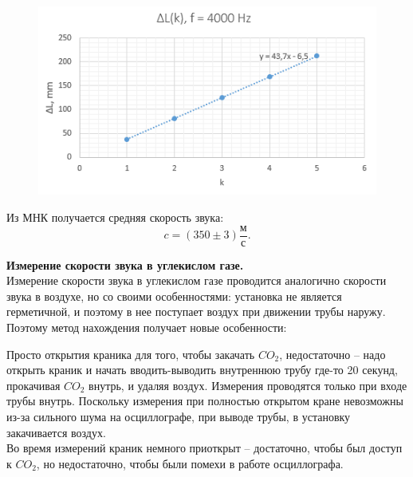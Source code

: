 \documentclass[12pt,a4paper]{article}
\begin{document}
\begin{figure}[h]
    \centering
    \begin{center}
    \end{center}
    \includegraphics[width=10 cm]{plot4.PNG}
    \label{fig:plot4}
\end{figure} 
\newpage

Из МНК получается средняя скорость звука:
$$c = (350\pm3)\frac{\text{м}}{\text{с}}.$$

\textbf{Измерение скорости звука в углекислом газе.}\\
Измерение скорости звука в углекислом газе проводится аналогично скорости звука в воздухе, но со своими особенностями: установка не является герметичной, и поэтому в нее поступает воздух при движении трубы наружу. Поэтому метод нахождения получает новые особенности:

Просто открытия краника для того, чтобы закачать $CO_2$, недостаточно -- надо открыть краник и начать вводить-выводить внутреннюю трубу где-то 20 секунд, прокачивая $CO_2$ внутрь, и удаляя воздух.
 Измерения проводятся только при входе трубы внутрь. Поскольку измерения при полностью открытом кране невозможны из-за сильного шума на осциллографе, при выводе трубы, в установку закачивается воздух.\\
Во время измерений краник немного приоткрыт -- достаточно, чтобы был доступ к $CO_2$, но недостаточно, чтобы были помехи в работе осциллографа.
\end{document}
